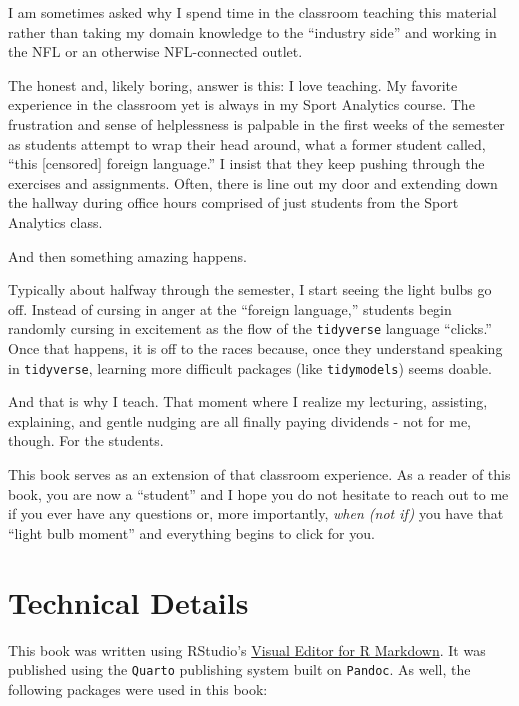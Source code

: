\documentclass[
  letterpaper,
]{krantz}
\begin{document}
I am sometimes asked why I spend time in the classroom teaching this
material rather than taking my domain knowledge to the ``industry side''
and working in the NFL or an otherwise NFL-connected outlet.

The honest and, likely boring, answer is this: I love teaching. My
favorite experience in the classroom yet is always in my Sport Analytics
course. The frustration and sense of helplessness is palpable in the
first weeks of the semester as students attempt to wrap their head
around, what a former student called, ``this {[}censored{]} foreign
language.'' I insist that they keep pushing through the exercises and
assignments. Often, there is line out my door and extending down the
hallway during office hours comprised of just students from the Sport
Analytics class.

And then something amazing happens.

Typically about halfway through the semester, I start seeing the light
bulbs go off. Instead of cursing in anger at the ``foreign language,''
students begin randomly cursing in excitement as the flow of the
\texttt{tidyverse} language ``clicks.'' Once that happens, it is off to
the races because, once they understand speaking in \texttt{tidyverse},
learning more difficult packages (like \texttt{tidymodels}) seems
doable.

And that is why I teach. That moment where I realize my lecturing,
assisting, explaining, and gentle nudging are all finally paying
dividends - not for me, though. For the students.

This book serves as an extension of that classroom experience. As a
reader of this book, you are now a ``student'' and I hope you do not
hesitate to reach out to me if you ever have any questions or, more
importantly, \emph{when (not if)} you have that ``light bulb moment''
and everything begins to click for you.

\hypertarget{technical-details}{%
\section*{Technical Details}\label{technical-details}}

This book was written using RStudio's
\href{https://rstudio.github.io/visual-markdown-editing/}{Visual Editor
for R Markdown}. It was published using the \texttt{Quarto} publishing
system built on \texttt{Pandoc}. As well, the following packages were
used in this book:
\end{document}
